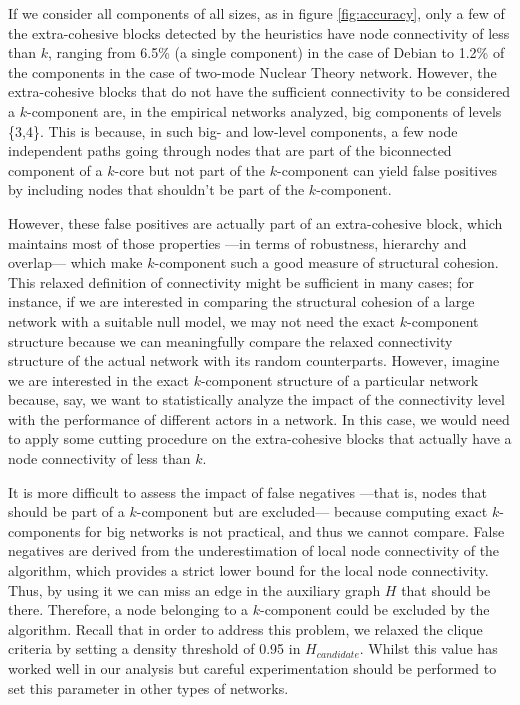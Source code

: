 If we consider all components of all sizes, as in figure \ref{fig:accuracy}, only a few of the extra-cohesive blocks detected by the heuristics have node connectivity of less than $k$, ranging from 6.5\% (a single component) in the case of Debian to 1.2\% of the components in the case of two-mode Nuclear Theory network. However, the extra-cohesive blocks that do not have the sufficient connectivity to be considered a $k$-component are, in the empirical networks analyzed, big components of levels \{3,4\}. This is because, in such big- and low-level components, a few node independent paths going through nodes that are part of the biconnected component of a $k$-core but not part of the $k$-component can yield false positives by including nodes that shouldn't be part of the $k$-component.

However, these false positives are actually part of an extra-cohesive block, which maintains most of those properties ---in terms of robustness, hierarchy and overlap--- which make $k$-component such a good measure of structural cohesion. This relaxed definition of connectivity might be sufficient in many cases; for instance, if we are interested in comparing the structural cohesion of a large network with a suitable null model, we may not need the exact $k$-component structure because we can meaningfully compare the relaxed connectivity structure of the actual network with its random counterparts. However, imagine we are interested in the exact $k$-component structure of a particular network because, say, we want to statistically analyze the impact of the connectivity level with the performance of different actors in a network. In this case, we would need to apply some cutting procedure on the extra-cohesive blocks that actually have a node connectivity of less than $k$.

It is more difficult to assess the impact of false negatives ---that is, nodes that should be part of a $k$-component but are excluded--- because computing exact $k$-components for big networks is not practical, and thus we cannot compare. False negatives are derived from the underestimation of local node connectivity of the \citet{white:2001b} algorithm, which provides a strict lower bound for the local node connectivity. Thus, by using it we can miss an edge in the auxiliary graph $H$ that should be there. Therefore, a node belonging to a $k$-component could be excluded by the algorithm. Recall that in order to address this problem, we relaxed the clique criteria by setting a density threshold of 0.95 in $H_{candidate}$. Whilst this value has worked well in our analysis but careful experimentation should be performed to set this parameter in other types of networks.

